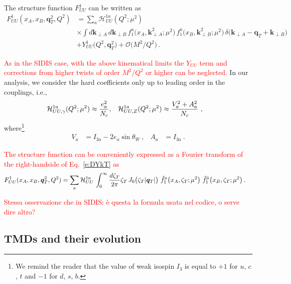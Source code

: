 \documentclass[aps,preprintnumbers,showpacs,nofootinbib,superscriptaddress,floatfix]{revtex4}
\newcommand{\T}{\perp}
\newcommand{\bT}{\zeta_T}
\begin{document}
The structure function $F_{UU}^1$ can be written as
\begin{align}
\label{e:DYkT}
   F_{UU}^1(x_A,x_B, \bm{q}_{T}^2, Q^2) &= \sum_a \mathcal{H}_{UU}^{1 a}(Q^2;\mu^2) \\ 
      &\times \int d\bm{k}_{\T A}^{} \, d\bm{k}_{\T B}^{} 
\,  f_1^a\big(x_A,\bm{k}_{\T A}^2; \mu^2 \big) 
\, f_{1}^{\bar{a}}\big(x_B,\bm{k}_{\T B}^2; \mu^2 \big) \,
      \delta \big({\bm k}_{\T A} - {\bm q}_T + {\bm k}_{\T B}\big)
\nonumber\\&
\nonumber + Y_{UU}^1\big(Q^2, \bm{q}_T^2\big) + \mathcal{O}\big(M^2/Q^2\big) \, .
\end{align} 


\textcolor{red}{As in the SIDIS case, with the above kinematical limits the
  $Y_{UU}$ term and corrections from higher twists of order $M^2/Q^2$ or
  higher can be neglected.}
In our analysis, we consider the hard coefficients only up to leading order in
the couplings, i.e.,
\begin{align} 
{\cal H}_{UU, \gamma}^{1 a}(Q^2;\mu^2) &\approx \frac{e_a^2}{N_c},
&
{\cal H}_{UU, Z}^{1 a}(Q^2;\mu^2) &\approx \frac{V_a^2+A_a^2}{N_c} \ ,
\end{align}  
where\footnote{We remind the reader that the value of weak isospin $I_3$ is equal to $+1$ for $u$, $c$, $t$ and
  $-1$ for $d$, $s$, $b$.}
\begin{align}
V_a & = I_{3a} - 2 e_{a} \sin \theta_W \  ,
&
A_a & = I_{3a} \  .
\end{align} 

\textcolor{red}{The structure function can be conveniently expressed as a Fourier transform of the right-handside of Eq.~\eqref{e:DYkT} as }
\begin{align}
\label{e:DYkTFF}
   F_{UU}^1(x_A,x_B, \bm{q}_T^2, Q^2) &=
 \sum_a {\cal H}_{UU}^{1 a} \, \int_0^{\infty} \frac{d \bT}{2 \pi} \bT\, J_0\big( \bT |\bm{q}_T|\big)\ 
      \tilde{f}_1^a\big(x_A, \bT;\mu^2\big) \   \tilde{f}_1^{\bar{a}}\big(x_B, \bT;\mu^2 \big)  \, .
\end{align} 

\textcolor{red}{ Stessa osservazione che in SIDIS: \`e questa la formula usata nel codice, o serve dire altro?}



\subsection{TMDs and their evolution}
\label{ss:TMDevo}
\end{document}
